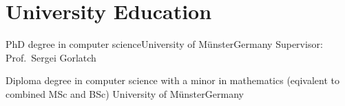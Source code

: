 \section{University Education}
        {PhD degree in computer science}{University of Münster}{Germany}{}
        {Supervisor: Prof.\ Sergei Gorlatch}

        {Diploma degree in computer science with a minor in mathematics}
        {\newline(eqivalent to combined MSc and BSc) University of Münster}{Germany}{}{}